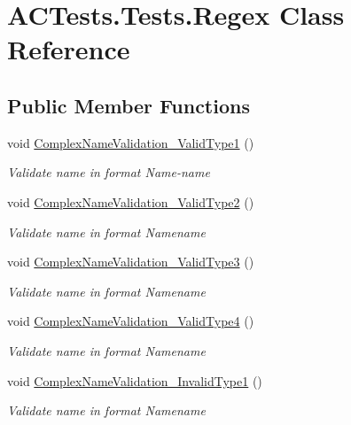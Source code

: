 \hypertarget{class_a_c_tests_1_1_tests_1_1_regex}{}\section{A\+C\+Tests.\+Tests.\+Regex Class Reference}
\label{class_a_c_tests_1_1_tests_1_1_regex}
\subsection*{Public Member Functions}
\begin{DoxyCompactItemize}
\item 
void \mbox{\hyperlink{class_a_c_tests_1_1_tests_1_1_regex_ae7797ffa0e417b55c28c6636b37c047d}{Complex\+Name\+Validation\+\_\+\+Valid\+Type1}} ()
\begin{DoxyCompactList}\small\item\em Validate name in format Name-\/name \end{DoxyCompactList}\item 
void \mbox{\hyperlink{class_a_c_tests_1_1_tests_1_1_regex_a54844da3681dc14ab6578e17553fe8b4}{Complex\+Name\+Validation\+\_\+\+Valid\+Type2}} ()
\begin{DoxyCompactList}\small\item\em Validate name in format Name\textquotesingle{}name \end{DoxyCompactList}\item 
void \mbox{\hyperlink{class_a_c_tests_1_1_tests_1_1_regex_a60d236d5c061cae8d66743e2af761b1e}{Complex\+Name\+Validation\+\_\+\+Valid\+Type3}} ()
\begin{DoxyCompactList}\small\item\em Validate name in format Name\textquotesingle{}name \end{DoxyCompactList}\item 
void \mbox{\hyperlink{class_a_c_tests_1_1_tests_1_1_regex_ad7611ecbd68a27461894f2a9f10c1780}{Complex\+Name\+Validation\+\_\+\+Valid\+Type4}} ()
\begin{DoxyCompactList}\small\item\em Validate name in format Name\textquotesingle{}name \end{DoxyCompactList}\item 
void \mbox{\hyperlink{class_a_c_tests_1_1_tests_1_1_regex_aed8771049664094309007e7d9d57d8ef}{Complex\+Name\+Validation\+\_\+\+Invalid\+Type1}} ()
\begin{DoxyCompactList}\small\item\em Validate name in format Name\textquotesingle{}name \end{DoxyCompactList}\item 

\end{DoxyCompactItemize}
